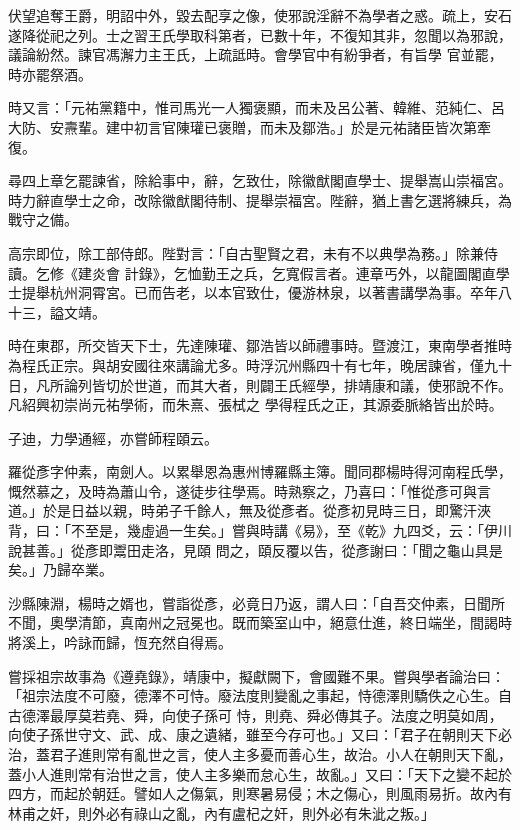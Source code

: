 \begin{pinyinscope}
 伏望追奪王爵，明詔中外，毀去配享之像，使邪說淫辭不為學者之惑。疏上，安石遂降從祀之列。士之習王氏學取科第者，已數十年，不復知其非，忽聞以為邪說，議論紛然。諫官馮澥力主王氏，上疏詆時。會學官中有紛爭者，有旨學
 官並罷，時亦罷祭酒。



 時又言：「元祐黨籍中，惟司馬光一人獨褒顯，而未及呂公著、韓維、范純仁、呂大防、安燾輩。建中初言官陳瓘已褒贈，而未及鄒浩。」於是元祐諸臣皆次第牽復。



 尋四上章乞罷諫省，除給事中，辭，乞致仕，除徽猷閣直學士、提舉嵩山崇福宮。時力辭直學士之命，改除徽猷閣待制、提舉崇福宮。陛辭，猶上書乞選將練兵，為戰守之備。



 高宗即位，除工部侍郎。陛對言：「自古聖賢之君，未有不以典學為務。」除兼侍讀。乞修《建炎會
 計錄》，乞恤勤王之兵，乞寬假言者。連章丐外，以龍圖閣直學士提舉杭州洞霄宮。已而告老，以本官致仕，優游林泉，以著書講學為事。卒年八十三，謚文靖。



 時在東郡，所交皆天下士，先達陳瓘、鄒浩皆以師禮事時。暨渡江，東南學者推時為程氏正宗。與胡安國往來講論尤多。時浮沉州縣四十有七年，晚居諫省，僅九十日，凡所論列皆切於世道，而其大者，則闢王氏經學，排靖康和議，使邪說不作。凡紹興初崇尚元祐學術，而朱熹、張栻之
 學得程氏之正，其源委脈絡皆出於時。



 子迪，力學通經，亦嘗師程頤云。



 羅從彥字仲素，南劍人。以累舉恩為惠州博羅縣主簿。聞同郡楊時得河南程氏學，慨然慕之，及時為蕭山令，遂徒步往學焉。時熟察之，乃喜曰：「惟從彥可與言道。」於是日益以親，時弟子千餘人，無及從彥者。從彥初見時三日，即驚汗浹背，曰：「不至是，幾虛過一生矣。」嘗與時講《易》，至《乾》九四爻，云：「伊川說甚善。」從彥即鬻田走洛，見頤
 問之，頤反覆以告，從彥謝曰：「聞之龜山具是矣。」乃歸卒業。



 沙縣陳淵，楊時之婿也，嘗詣從彥，必竟日乃返，謂人曰：「自吾交仲素，日聞所不聞，奧學清節，真南州之冠冕也。既而築室山中，絕意仕進，終日端坐，間謁時將溪上，吟詠而歸，恆充然自得焉。



 嘗採祖宗故事為《遵堯錄》，靖康中，擬獻闕下，會國難不果。嘗與學者論治曰：「祖宗法度不可廢，德澤不可恃。廢法度則變亂之事起，恃德澤則驕佚之心生。自古德澤最厚莫若堯、舜，向使子孫可
 恃，則堯、舜必傳其子。法度之明莫如周，向使子孫世守文、武、成、康之遺緒，雖至今存可也。」又曰：「君子在朝則天下必治，蓋君子進則常有亂世之言，使人主多憂而善心生，故治。小人在朝則天下亂，蓋小人進則常有治世之言，使人主多樂而怠心生，故亂。」又曰：「天下之變不起於四方，而起於朝廷。譬如人之傷氣，則寒暑易侵；木之傷心，則風雨易折。故內有林甫之奸，則外必有祿山之亂，內有盧杞之奸，則外必有朱泚之叛。」




\end{pinyinscope}
